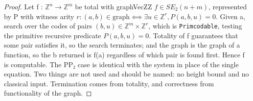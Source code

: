 \begin{proof}
Let f : $ℤ^{n} → ℤ^{m}$ be total with graphVecZZ $f ∈ SE_{2}(n+m)$, represented by P with witness arity $r: (a, b) ∈ \mathrm{graph} ⟺ ∃u ∈ ℤ^{r}, P(a, b, u) = 0$. Given a, search over the codes of pairs $(b, u) ∈ ℤ^{m} × ℤ^{r}$, which is \texttt{Primcodable}, testing the primitive recursive predicate $P(a,b,u) = 0$. Totality of f guarantees that some pair satisfies it, so the search terminates; and the graph is the graph of a function, so the b returned is f(a) regardless of which pair is found first. Hence f is computable. The PP₂ case is identical with the system in place of the single equation. Two things are not used and should be named: no height bound and no classical input. Termination comes from totality, and correctness from functionality of the graph.

\end{proof}
